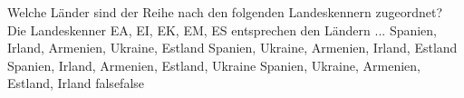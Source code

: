     {Welche Länder sind der Reihe nach den folgenden Landeskennern zugeordnet? Die Landeskenner EA, EI, EK, EM, ES entsprechen den Ländern ...}
    {Spanien, Irland, Armenien, Ukraine, Estland}
    {Spanien, Ukraine, Armenien, Irland, Estland}
    {Spanien, Irland, Armenien, Estland, Ukraine}
    {Spanien, Ukraine, Armenien, Estland, Irland}
    {false}{false}